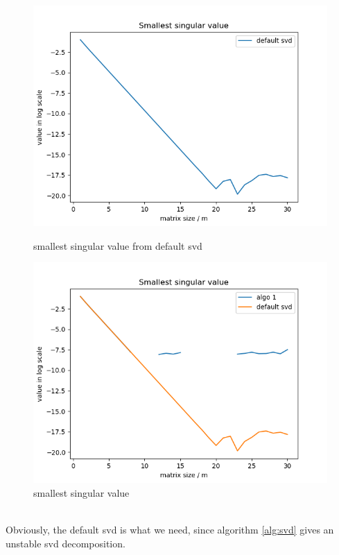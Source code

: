 \documentclass[english,onecolumn]{IEEEtran}
\begin{document}
\begin{enumerate}
\begin{figure}[htbp]
        \begin{minipage}[t]{0.33\linewidth}
            \centering
            \includegraphics[width=1\textwidth]{p2_3_def.png}
            \caption{smallest singular value from default svd}
            \label{fig.p2_3_def}
        \end{minipage}
        \begin{minipage}[t]{0.33\linewidth}
            \centering
            \includegraphics[width=1\textwidth]{p2_3_together.png}
            \caption{smallest singular value}
            \label{fig.p2_3_together}
        \end{minipage}
    \end{figure}
    \\Obviously, the default svd is what we need, since algorithm \ref{alg:svd} gives an unstable svd decomposition.
\end{enumerate}
\end{document}
